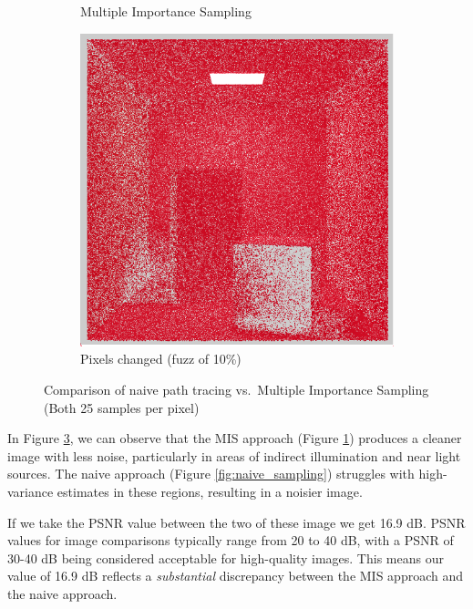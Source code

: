 \documentclass[12pt]{article}
\begin{document}
\begin{figure}[H]
\begin{subfigure}[t]{0.32\textwidth}
        \caption{Multiple Importance Sampling}
        \label{fig:mis_sampling}
    \end{subfigure}
    \hfill
    \begin{subfigure}[t]{0.32\textwidth}
        \centering
        \includegraphics[width=\textwidth]{images/25_samp/comparison.png}
        \caption{Pixels changed (fuzz of 10\%)}
        \label{fig:comparison}
    \end{subfigure}
    \caption{Comparison of naive path tracing vs.\ Multiple Importance Sampling (Both 25 samples per pixel)}
    \label{fig:sampling_comparison}
\end{figure}

In Figure \ref{fig:sampling_comparison}, we can observe that the MIS approach (Figure \ref{fig:mis_sampling}) produces a cleaner image with less noise, particularly in areas of indirect illumination and near light sources. The naive approach (Figure \ref{fig:naive_sampling}) struggles with high-variance estimates in these regions, resulting in a noisier image.

If we take the PSNR value between the two of these image we get 16.9 dB. PSNR values for image comparisons typically range from 20 to 40 dB, with a PSNR of 30-40 dB being considered acceptable for high-quality images. This means our value of 16.9 dB reflects a \textit{substantial} discrepancy between the MIS approach and the naive approach.
\end{document}
